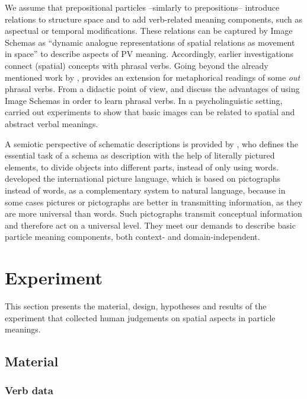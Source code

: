 \documentclass[output=paper]{langsci/langscibook}
\begin{document}
We assume that prepositional particles --simlarly to prepositions--
introduce relations to structure space and to add verb-related meaning
components, such as aspectual or temporal modifications. These
relations can be captured by Image Schemas as ``dynamic analogue
representations of spatial relations as movement in space''
\citep{Gibbs/Colston:95} to describe aspects of PV
meaning. Accordingly, earlier investigations connect (spatial)
concepts with phrasal verbs. Going beyond the already mentioned work
by \cite{Lindner:83}, \cite{Morgan:97} provides an extension for
metaphorical readings of some \textit{out} phrasal verbs. From a
didactic point of view, \cite{Side:90} and \cite{Abreu/Vieira:08}
discuss the advantages of using Image Schemas in order to learn
phrasal verbs. In a psycholinguistic setting, \cite{RichardsonEtAl:01}
carried out experiments to show that basic images can be related to
spatial and abstract verbal meanings.

A semiotic perspective of schematic descriptions is provided by
\cite{Frutiger:87}, who defines the essential task of a schema as
description with the help of literally pictured elements, to divide
objects into different parts, instead of only using
words. \cite{Neurath:83} developed the international picture language,
which is based on pictographs instead of words, as a complementary
system to natural language, because in some cases pictures or
pictographs are better in transmitting information, as they are more
universal than words. Such pictographs transmit conceptual information
and therefore act on a universal level. They meet our demands to
describe basic particle meaning components, both context- and
domain-independent.


\section{Experiment}
\label{sec:exp}

This section presents the material, design, hypotheses and results of
the experiment that collected human judgements on spatial aspects in
particle meanings.

\subsection{Material}

\subsubsection{Verb data}
\label{sec:data}
\end{document}
